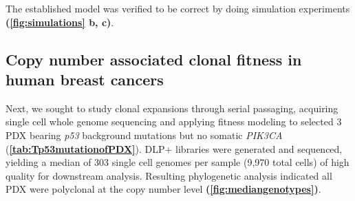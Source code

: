The established model was verified to be correct by doing simulation experiments \cite{salehi2020single} \textbf{(\autoref{fig:simulations} b, c)}.




\subsection{Copy number associated clonal fitness in human breast cancers}

Next, we sought to study clonal expansions through serial passaging, acquiring single cell whole genome sequencing and applying fitness modeling to selected 3 PDX bearing \textit{p53} background mutations but no somatic  \textit{PIK3CA} (\textbf{\autoref{tab:Tp53mutationofPDX}}).
%
DLP+ libraries were generated and sequenced, yielding a median of 303 single cell genomes per sample (9,970 total cells) of high quality for downstream analysis. Resulting phylogenetic analysis indicated all PDX were polyclonal at the copy number level \textbf{(\autoref{fig:mediangenotypes})}.

 

